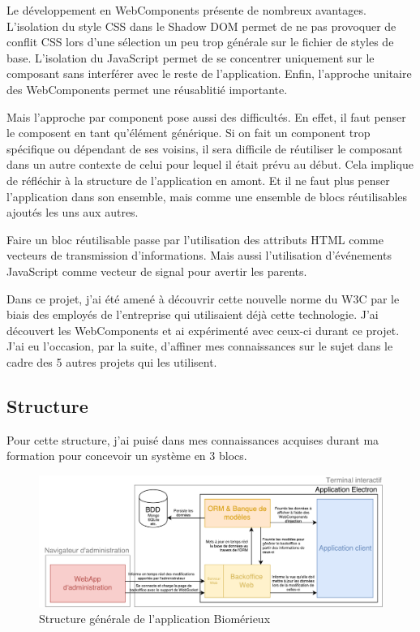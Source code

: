 \bigskip

Le développement en WebComponents présente de nombreux avantages.
L'isolation du style CSS dans le Shadow DOM permet de ne pas provoquer de conflit CSS lors d'une sélection un peu trop générale sur le fichier de styles de base.
L'isolation du JavaScript permet de se concentrer uniquement sur le composant sans interférer avec le reste de l'application.
Enfin, l'approche unitaire des WebComponents permet une réusablitié importante.

Mais l'approche par component pose aussi des difficultés.
En effet, il faut penser le composent en tant qu'élément générique.
Si on fait un component trop spécifique ou dépendant de ses voisins, il sera difficile de réutiliser le composant dans un autre contexte de celui pour lequel il était prévu au début.
Cela implique de réfléchir à la structure de l'application en amont.
Et il ne faut plus penser l'application dans son ensemble, mais comme une ensemble de blocs réutilisables ajoutés les uns aux autres.

Faire un bloc réutilisable passe par l'utilisation des attributs HTML comme vecteurs de transmission d'informations.
Mais aussi l'utilisation d'événements JavaScript comme vecteur de signal pour avertir les parents.

\bigskip

Dans ce projet, j'ai été amené à découvrir cette nouvelle norme du W3C par le biais des employés de l'entreprise qui utilisaient déjà cette technologie.
J'ai découvert les WebComponents et ai expérimenté avec ceux-ci durant ce projet.
J'ai eu l'occasion, par la suite, d'affiner mes connaissances sur le sujet dans le cadre des 5 autres projets qui les utilisent.

\subsection{Structure}

Pour cette structure, j'ai puisé dans mes connaissances acquises durant ma formation pour concevoir un système en 3 blocs.

\begin{figure}[h]
    \centering
    \includegraphics[scale=0.6]{img/Proposition-utopia.pdf}
    \caption{Structure générale de l'application Biomérieux}
\end{figure}

